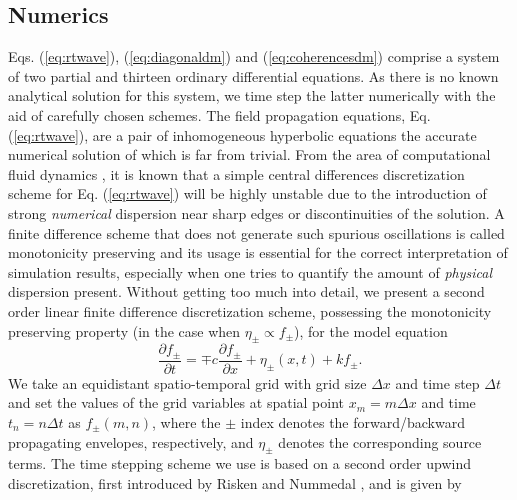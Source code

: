 \documentclass[10pt,letterpaper]{article}%
\begin{document}
\begin{appendices}%


\section{Numerics}

\label{sec:numerics} Eqs. (\ref{eq:rtwave}), (\ref{eq:diagonaldm}) and
(\ref{eq:coherencesdm}) comprise a system of two partial and thirteen ordinary
differential equations. As there is no known analytical solution for this
system, we time step the latter numerically with the aid of carefully chosen
schemes. The field propagation equations, Eq. (\ref{eq:rtwave}), are a pair of
inhomogeneous hyperbolic equations the accurate numerical solution of which is
far from trivial. From the area of computational fluid dynamics
\cite{wesseling2009principles}, it is known that a simple central differences
discretization scheme for Eq. (\ref{eq:rtwave}) will be highly unstable due to
the introduction of strong \emph{numerical} dispersion near sharp edges or
discontinuities of the solution. A finite difference scheme that does not
generate such spurious oscillations is called monotonicity preserving
\cite{wesseling2009principles} and its usage is essential for the correct
interpretation of simulation results, especially when one tries to quantify
the amount of \emph{physical} dispersion present. Without getting too much
into detail, we present a second order linear finite difference discretization
scheme, possessing the monotonicity preserving property (in the case when
$\eta_{\pm}\propto f_{\pm}$), for the model equation
\begin{equation}
\frac{\partial f_{\pm}}{\partial t}=\mp c\frac{\partial f_{\pm}}{\partial
x}+\eta_{\pm}(x,t)+kf_{\pm}.\label{eq:genericwave}%
\end{equation}
We take an equidistant spatio-temporal grid with grid size $\Delta x$ and time
step $\Delta t$ and set the values of the grid variables at spatial point
$x_{m}=m\Delta x$ and time $t_{n}=n\Delta t$ as $f_{\pm}(m,n)$, where the
$\pm$ index denotes the forward/backward propagating envelopes, respectively, and $\eta_{\pm}$ denotes the corresponding source terms. The time stepping scheme we use is based on a second order upwind
discretization, first introduced by Risken and Nummedal \cite{risken1968self},
and is given by
\begin{align}

\end{align}
\end{appendices}
\end{document}
